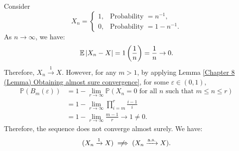 \documentclass{huhtakm-template-book-v2}
\newcommand{\prob}{\mathbb{P}}
\newcommand{\expect}{\mathbb{E}}
\begin{document}
    \begin{eg}
        Consider
        \begin{equation*}
            X_{n} = \begin{cases}
                1, &\text{Probability } = n^{-1},\\
                0, &\text{Probability } = 1-n^{-1}.
            \end{cases}
        \end{equation*}
        As $n \to \infty$, we have:
        \begin{equation*}
            \expect\abs{X_{n}-X} = 1\left(\frac{1}{n}\right) = \frac{1}{n} \to 0.
        \end{equation*}
        Therefore, $X_{n} \xrightarrow{1} X$. However, for any $m > 1$, by applying Lemma \ref{Chapter 8 (Lemma) Obtaining almost sure convergence}, for some $\varepsilon \in (0,1)$,
        \begin{align*}
            \prob(B_{m}(\varepsilon)) &= 1-\lim_{r \to \infty}\prob(X_{n} = 0 \text{ for all } n \text{ such that } m \leq n \leq r)\\
            &= 1-\lim_{r \to \infty}\prod_{i = m}^{r}\frac{i-1}{i}\\
            &= 1-\lim_{r \to \infty}\frac{m-1}{r} \to 1 \neq 0.
        \end{align*}
        Therefore, the sequence does not converge almost surely. We have:
        \begin{equation*}
            (X_{n} \xrightarrow{1} X) \centernot\implies (X_{n} \xrightarrow{\text{a.s.}} X).
        \end{equation*}
    \end{eg}
    \newpage
\end{document}
